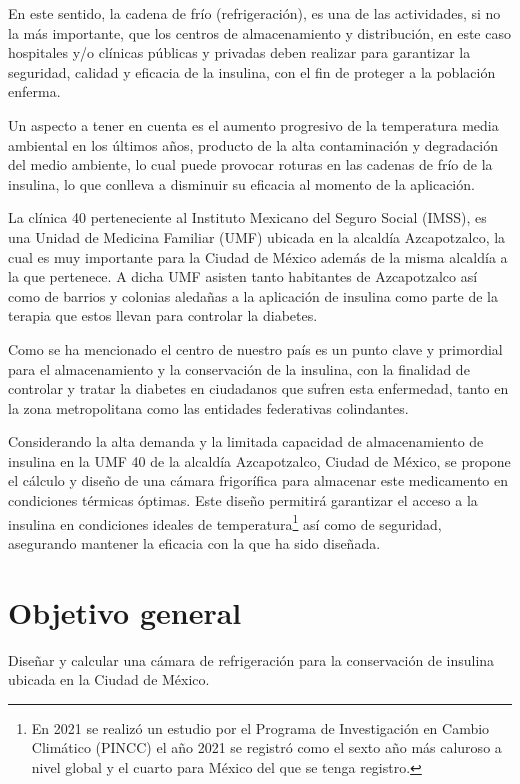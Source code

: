 En este sentido, la cadena de frío (refrigeración), es una de las actividades, si no la más importante, que los centros de almacenamiento y distribución, en este caso hospitales y/o clínicas públicas y privadas  deben realizar para garantizar la seguridad, calidad y eficacia de la insulina, con el fin de proteger a la población enferma.

Un aspecto a tener en cuenta es el aumento progresivo de la temperatura media ambiental en los últimos años,  producto de la alta contaminación y degradación del  medio ambiente, lo cual puede provocar roturas en las cadenas de frío de la insulina, lo que conlleva a disminuir su eficacia al momento de la aplicación. 

La clínica 40 perteneciente al Instituto Mexicano del Seguro Social (IMSS), es una Unidad de Medicina Familiar (UMF) ubicada en la alcaldía Azcapotzalco, la cual es muy importante para la Ciudad de México además de la misma alcaldía a la que pertenece. A dicha UMF asisten tanto habitantes de Azcapotzalco así como de barrios y colonias aledañas a la aplicación de insulina como parte de la terapia que estos llevan para controlar la diabetes.

Como se ha mencionado el centro de nuestro país es un punto clave y primordial para el almacenamiento y la conservación de la insulina, con la finalidad de controlar y tratar la diabetes en ciudadanos que sufren esta enfermedad, tanto en la zona metropolitana como las entidades federativas colindantes.

Considerando la alta demanda y la limitada capacidad de almacenamiento de insulina en la UMF 40 de la alcaldía Azcapotzalco, Ciudad de México, se propone el cálculo y diseño de una cámara frigorífica para almacenar este medicamento en condiciones térmicas óptimas. Este diseño permitirá garantizar el acceso a la insulina en condiciones ideales de temperatura\footnote{En 2021 se realizó un estudio por el Programa de Investigación en Cambio Climático (PINCC) el año 2021 se registró como el sexto año más caluroso a nivel global y el cuarto para México del que se tenga registro.} así como de seguridad, asegurando mantener la eficacia con la que ha sido diseñada. 


\section*{Objetivo general}
Diseñar y calcular una cámara de refrigeración para la conservación de insulina ubicada en la Ciudad de México. 

